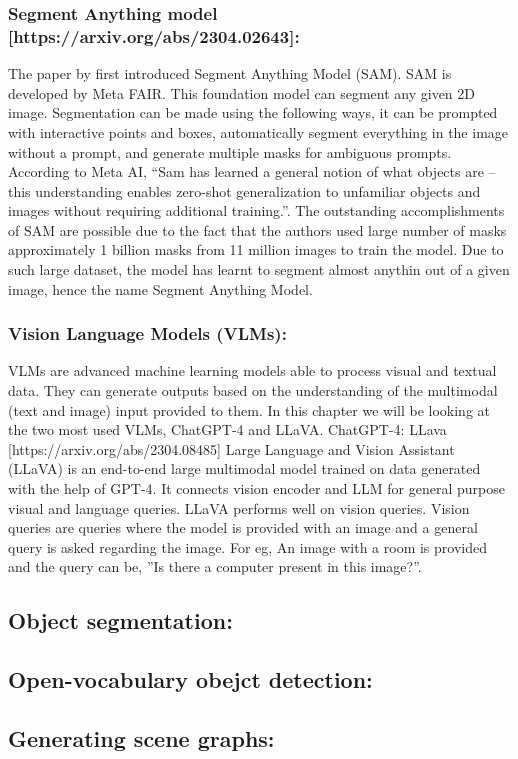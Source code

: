 \subsubsection{Segment Anything model [https://arxiv.org/abs/2304.02643]:}
The paper by \citet{kirillov2023segment} first introduced Segment Anything Model (SAM). SAM is developed by Meta FAIR. 
This foundation model can segment any given 2D image. Segmentation can be made using the following ways, 
it can be prompted with interactive points and boxes, automatically segment everything in the image without a prompt, 
and generate multiple masks for ambiguous prompts. According to Meta AI, “Sam has learned a general notion of what objects are – this understanding enables zero-shot generalization to 
unfamiliar objects and images without requiring additional training.”. The outstanding accomplishments of SAM are possible due to the fact that
the authors used large number of masks approximately 1 billion masks from 11 million images to train the model. Due to such large dataset, 
the model has learnt to segment almost anythin out of a given image, hence the name Segment Anything Model.

\subsubsection{Vision Language Models (VLMs):}
VLMs are advanced machine learning models able to process visual and textual data. 
They  can generate outputs based on the understanding of the multimodal (text and image) input provided to them. 
In this chapter we will be looking at the two most used VLMs, ChatGPT-4 and LLaVA.
ChatGPT-4:
LLava [https://arxiv.org/abs/2304.08485]
 Large Language and Vision Assistant (LLaVA) is an end-to-end large multimodal model trained on data generated with the help of GPT-4. 
 It connects vision encoder and LLM for general purpose visual and language queries. LLaVA performs well on vision queries. 
 Vision queries are queries where the model is provided with an image and a general query is asked regarding the image. 
 For eg, An image with a room is provided and the query can be, ”Is there a computer present in this image?”. 

\subsection{Object segmentation:}
\subsection{Open-vocabulary obejct detection:}
\subsection{Generating scene graphs:}
